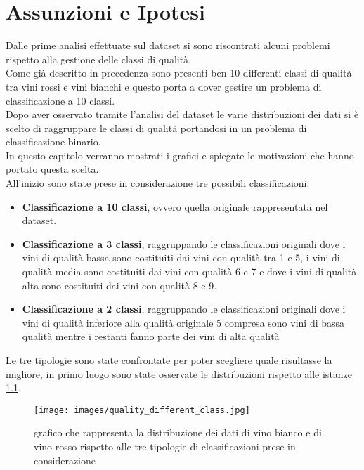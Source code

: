 \chapter{Assunzioni e Ipotesi}
\label{ch:assunzioni}

Dalle prime analisi effettuate sul dataset si sono riscontrati alcuni problemi rispetto alla gestione delle classi di qualità.\\
Come già descritto in precedenza sono presenti ben 10 differenti classi di qualità tra vini rossi e vini bianchi e questo porta a dover gestire un problema di classificazione a 10 classi.\\
Dopo aver osservato tramite l'analisi del dataset le varie distribuzioni dei dati si è scelto di raggruppare le classi di qualità portandosi in un problema di classificazione binario.\\
In questo capitolo verranno mostrati i grafici e spiegate le motivazioni che hanno portato questa scelta.\\
All'inizio sono state prese in considerazione tre possibili classificazioni:
\begin{itemize}
    \item \textbf{Classificazione a 10 classi}, ovvero quella originale rappresentata nel dataset.
    \item \textbf{Classificazione a 3 classi}, raggruppando le classificazioni originali dove i vini di qualità bassa sono costituiti dai vini con qualità tra 1 e 5, i vini di qualità media sono costituiti dai vini con qualità 6 e 7 e dove i vini di qualità alta sono costituiti dai vini con qualità 8 e 9.
    \item \textbf{Classificazione a 2 classi}, raggruppando le classificazioni originali dove i vini di qualità inferiore alla qualità originale 5 compresa sono vini di bassa qualità mentre i restanti fanno parte dei vini di alta qualità
\end{itemize}
Le tre tipologie sono state confrontate per poter scegliere quale risultasse la migliore, in primo luogo sono state osservate le distribuzioni rispetto alle istanze \ref{fig:quality_different_class}.\\

\begin{figure}
    \centering
    \texttt{[image: images/quality\_different\_class.jpg]}
    \caption{grafico che rappresenta la distribuzione dei dati di vino bianco e di vino rosso rispetto alle tre tipologie di classificazioni prese in considerazione}
    \label{fig:quality_different_class}
\end{figure}


